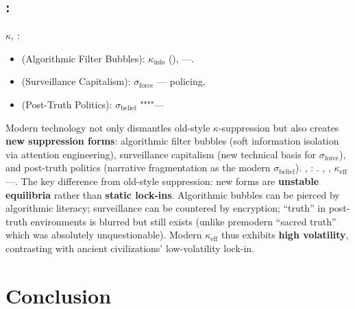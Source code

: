 \documentclass[11pt,a4paper]{article}
\theoremstyle{definition}
\newcommand{\coupling}{\kappa}
\newcommand{\suppress}{\sigma}
\begin{document}
\subsection{:}
 $\coupling$, : 
\begin{itemize}
 \item (Algorithmic Filter Bubbles): 
 $\coupling_{\text{info}}$ (), 
 ---.
 \item (Surveillance Capitalism): 
 $\suppress_{\text{force}}$ --- policing, 
 \item (Post-Truth Politics): 
 $\suppress_{\text{belief}}$ """"---
\end{itemize}
Modern technology not only dismantles old-style $\coupling$-suppression but also
creates \textbf{new suppression forms}: algorithmic filter bubbles (soft information
isolation via attention engineering), surveillance capitalism (new technical basis
for $\suppress_{\text{force}}$), and post-truth politics (narrative fragmentation
as the modern $\suppress_{\text{belief}}$).
, : .
, , 
 $\coupling_{\text{eff}}$ ---.
The key difference from old-style suppression: new forms are \textbf{unstable equilibria}
rather than \textbf{static lock-ins}. Algorithmic bubbles can be pierced by algorithmic
literacy; surveillance can be countered by encryption; ``truth'' in post-truth environments
is blurred but still exists (unlike premodern ``sacred truth'' which was absolutely
unquestionable). Modern $\coupling_{\text{eff}}$ thus exhibits \textbf{high volatility},
contrasting with ancient civilizations' low-volatility lock-in.
\section{Conclusion}
\end{document}
